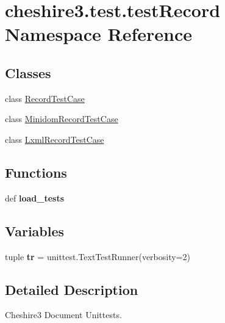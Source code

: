 \hypertarget{namespacecheshire3_1_1test_1_1test_record}{\section{cheshire3.\-test.\-test\-Record Namespace Reference}
\label{namespacecheshire3_1_1test_1_1test_record}
}
\subsection*{Classes}
\begin{DoxyCompactItemize}
\item 
class \hyperlink{classcheshire3_1_1test_1_1test_record_1_1_record_test_case}{Record\-Test\-Case}
\item 
class \hyperlink{classcheshire3_1_1test_1_1test_record_1_1_minidom_record_test_case}{Minidom\-Record\-Test\-Case}
\item 
class \hyperlink{classcheshire3_1_1test_1_1test_record_1_1_lxml_record_test_case}{Lxml\-Record\-Test\-Case}
\end{DoxyCompactItemize}
\subsection*{Functions}
\begin{DoxyCompactItemize}
\item 
\hypertarget{namespacecheshire3_1_1test_1_1test_record_a9fb19f353b0587f2c613158886817641}{def {\bfseries load\-\_\-tests}}\label{namespacecheshire3_1_1test_1_1test_record_a9fb19f353b0587f2c613158886817641}

\end{DoxyCompactItemize}
\subsection*{Variables}
\begin{DoxyCompactItemize}
\item 
\hypertarget{namespacecheshire3_1_1test_1_1test_record_a6a79c6afb0445e4672114cc3c625e3b1}{tuple {\bfseries tr} = unittest.\-Text\-Test\-Runner(verbosity=2)}\label{namespacecheshire3_1_1test_1_1test_record_a6a79c6afb0445e4672114cc3c625e3b1}

\end{DoxyCompactItemize}


\subsection{Detailed Description}
\begin{DoxyVerb}Cheshire3 Document Unittests.\end{DoxyVerb}
 